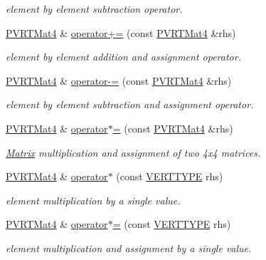 \begin{DoxyCompactItemize}
\begin{DoxyCompactList}\small\item\em element by element subtraction operator. \end{DoxyCompactList}\item 
\hyperlink{struct_p_v_r_t_mat4}{P\+V\+R\+T\+Mat4} \& \hyperlink{struct_p_v_r_t_mat4_a1e90019d2365961d1da2cf814f020957}{operator+=} (const \hyperlink{struct_p_v_r_t_mat4}{P\+V\+R\+T\+Mat4} \&rhs)
\begin{DoxyCompactList}\small\item\em element by element addition and assignment operator. \end{DoxyCompactList}\item 
\hyperlink{struct_p_v_r_t_mat4}{P\+V\+R\+T\+Mat4} \& \hyperlink{struct_p_v_r_t_mat4_a5156866ba5a3926a306dfece72ecd11f}{operator-\/=} (const \hyperlink{struct_p_v_r_t_mat4}{P\+V\+R\+T\+Mat4} \&rhs)
\begin{DoxyCompactList}\small\item\em element by element subtraction and assignment operator. \end{DoxyCompactList}\item 
\hyperlink{struct_p_v_r_t_mat4}{P\+V\+R\+T\+Mat4} \& \hyperlink{struct_p_v_r_t_mat4_a8bc494b6cf2362707b773db2b135208c}{operator$\ast$=} (const \hyperlink{struct_p_v_r_t_mat4}{P\+V\+R\+T\+Mat4} \&rhs)
\begin{DoxyCompactList}\small\item\em \hyperlink{class_matrix}{Matrix} multiplication and assignment of two 4x4 matrices. \end{DoxyCompactList}\item 
\hyperlink{struct_p_v_r_t_mat4}{P\+V\+R\+T\+Mat4} \& \hyperlink{struct_p_v_r_t_mat4_a239e50eb677b17c0e4d8fa4771747f5e}{operator$\ast$} (const \hyperlink{group___a_p_i___o_g_l_e_s_ga06da457b7d3e93368ab904f89e1396be}{V\+E\+R\+T\+T\+Y\+P\+E} rhs)
\begin{DoxyCompactList}\small\item\em element multiplication by a single value. \end{DoxyCompactList}\item 
\hyperlink{struct_p_v_r_t_mat4}{P\+V\+R\+T\+Mat4} \& \hyperlink{struct_p_v_r_t_mat4_af2e1375d875ef8513ce3f9df8a599965}{operator$\ast$=} (const \hyperlink{group___a_p_i___o_g_l_e_s_ga06da457b7d3e93368ab904f89e1396be}{V\+E\+R\+T\+T\+Y\+P\+E} rhs)
\begin{DoxyCompactList}\small\item\em element multiplication and assignment by a single value. \end{DoxyCompactList}\item 

\end{DoxyCompactItemize}
